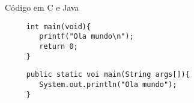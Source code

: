 \documentclass{beamer}
\begin{document}

%



\begin{frame}[fragile]{Código em C e Java}


\ansic
	\begin{lstlisting}
	 int main(void){
	    printf("Ola mundo\n");
	    return 0;
	 }
	\end{lstlisting}
\java
	\begin{lstlisting}
	 public static voi main(String args[]){
	    System.out.println("Ola mundo");
	 }
	\end{lstlisting}	
	
\end{frame}
\end{document}
